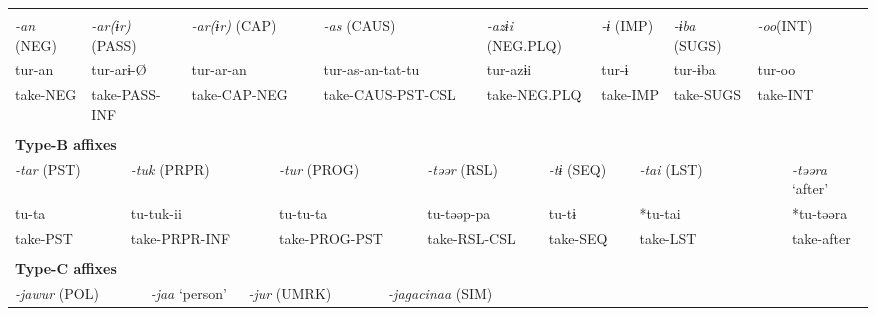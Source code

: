 \tabletail{}
\tablelasttail{}
\begin{tabularx}{\textwidth}{XXXXXXXXXXXXXXXXXXXXXXX}
\lsptoprule
\multicolumn{23}{X}{{\bfseries Type-A affixes}}\\
{ \textit{{}-an} (NEG)} & \multicolumn{4}{X}{{ \textit{{}-ar(ɨr)} (PASS)}} & \multicolumn{4}{X}{{ \textit{{}-ar(ɨr)} (CAP)}} & \multicolumn{4}{X}{{ \textit{{}-as} (CAUS)}} & \multicolumn{4}{X}{{ \textit{{}-azɨi} (NEG.PLQ)}} & \multicolumn{2}{X}{{ \textit{{}-ɨ} (IMP)}} & { \textit{{}-ɨba} (SUGS)} & \multicolumn{2}{X}{{ \textit{{}-oo}(INT)}} & \\
{ tur-an} & \multicolumn{4}{X}{{ tur-arɨ-Ø}} & \multicolumn{4}{X}{{ tur-ar-an}} & \multicolumn{4}{X}{{ tur-as-an-tat-tu}} & \multicolumn{4}{X}{{ tur-azɨi}} & \multicolumn{2}{X}{{ tur-ɨ}} & { tur-ɨba} & \multicolumn{2}{X}{{ tur-oo}} & \\
take-NEG & \multicolumn{4}{X}{take-PASS-INF} & \multicolumn{4}{X}{take-CAP-NEG} & \multicolumn{4}{X}{take-CAUS-PST-CSL} & \multicolumn{4}{X}{take-NEG.PLQ} & \multicolumn{2}{X}{take-IMP} & take-SUGS & \multicolumn{2}{X}{take-INT} & \\
\multicolumn{23}{X}{}\\
\multicolumn{23}{X}{{\bfseries Type-B affixes}}\\
\multicolumn{3}{X}{{ \textit{{}-tar} (PST)}} & \multicolumn{5}{X}{{ \textit{{}-tuk} (PRPR)}} & \multicolumn{3}{X}{{ \textit{{}-tur} (PROG)}} & \multicolumn{4}{X}{{ \textit{{}-təər} (RSL)}} & \multicolumn{3}{X}{{ \textit{{}-tɨ} (SEQ)}} & \multicolumn{3}{X}{{ \textit{{}-tai} (LST)}} & \multicolumn{2}{X}{{ \textit{{}-təəra} ‘after’}}\\
\multicolumn{3}{X}{{ tu-ta}} & \multicolumn{5}{X}{{ tu-tuk-ii}} & \multicolumn{3}{X}{{ tu-tu-ta}} & \multicolumn{4}{X}{{ tu-təəp-pa}} & \multicolumn{3}{X}{{ tu-tɨ}} & \multicolumn{3}{X}{{ *tu-tai}} & \multicolumn{2}{X}{{ *tu-təəra}}\\
\multicolumn{3}{X}{take-PST} & \multicolumn{5}{X}{take-PRPR-INF} & \multicolumn{3}{X}{take-PROG-PST} & \multicolumn{4}{X}{take-RSL-CSL} & \multicolumn{3}{X}{take-SEQ} & \multicolumn{3}{X}{take-LST} & \multicolumn{2}{X}{{ take-after}}\\
\multicolumn{3}{X}{} & \multicolumn{5}{X}{} & \multicolumn{3}{X}{} & \multicolumn{4}{X}{} & \multicolumn{3}{X}{} & \multicolumn{3}{X}{} & \multicolumn{2}{X}{}\\
\multicolumn{23}{X}{{\bfseries Type-C affixes}}\\
\multicolumn{4}{X}{{ \textit{{}-jawur} (POL)}} & \multicolumn{3}{X}{{ \textit{{}-jaa} ‘person’}} & \multicolumn{3}{X}{{ \textit{{}-jur} (UMRK)}} & \multicolumn{4}{X}{{ \textit{{}-jagacinaa} (SIM)}} & \multicolumn{9}{X}{}\\

\end{tabularx}
